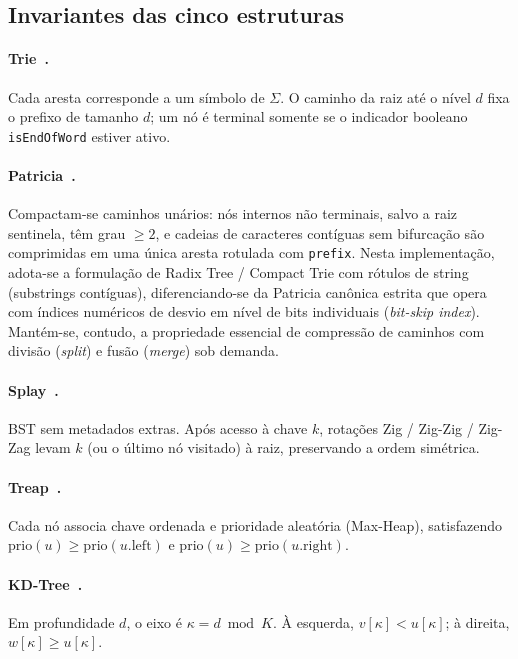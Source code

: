 \documentclass[11pt, a4paper]{article}
\begin{document}
\subsection{Invariantes das cinco estruturas}

\paragraph{Trie~\cite{fredkin1960}.}
Cada aresta corresponde a um símbolo de $\Sigma$. O caminho da raiz até o nível $d$ fixa o prefixo de tamanho $d$; um nó é terminal somente se o indicador booleano \texttt{isEndOfWord} estiver ativo.

\paragraph{Patricia~\cite{morrison1968}.}
Compactam-se caminhos unários: nós internos não terminais, salvo a raiz sentinela, têm grau $\ge 2$, e cadeias de caracteres contíguas sem bifurcação são comprimidas em uma única aresta rotulada com \texttt{prefix}. Nesta implementação, adota-se a formulação de Radix Tree / Compact Trie com rótulos de string (substrings contíguas), diferenciando-se da Patricia canônica estrita que opera com índices numéricos de desvio em nível de bits individuais (\textit{bit-skip index}). Mantém-se, contudo, a propriedade essencial de compressão de caminhos com divisão (\textit{split}) e fusão (\textit{merge}) sob demanda.

\paragraph{Splay~\cite{sleator1985}.}
BST sem metadados extras. Após acesso à chave $k$, rotações Zig / Zig-Zig / Zig-Zag levam $k$ (ou o último nó visitado) à raiz, preservando a ordem simétrica.

\paragraph{Treap~\cite{seidel1996}.}
Cada nó associa chave ordenada e prioridade aleatória (Max-Heap), satisfazendo $\mathrm{prio}(u) \ge \mathrm{prio}(u.\mathrm{left})$ e $\mathrm{prio}(u) \ge \mathrm{prio}(u.\mathrm{right})$.

\paragraph{KD-Tree~\cite{bentley1975}.}
Em profundidade $d$, o eixo é $\kappa=d\bmod K$. À esquerda, $v[\kappa]<u[\kappa]$; à direita, $w[\kappa]\ge u[\kappa]$.
\end{document}
